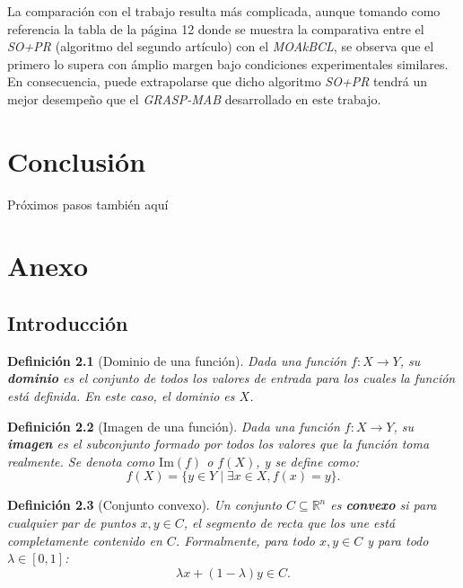 \documentclass[12pt,a4paper]{book}
\newtheorem{defi}{Definición}[section]
\begin{document}
La comparación con el trabajo \cite{k-Balanced_2} resulta más complicada, aunque tomando como referencia la tabla de la página 12 donde se muestra la comparativa entre el \textit{SO+PR} (algoritmo del segundo artículo) con el \textit{MOAkBCL}, se observa que el primero lo supera con ámplio margen bajo
condiciones experimentales similares. En consecuencia, puede extrapolarse que dicho algoritmo \textit{SO+PR} tendrá un mejor desempeño que el \textit{GRASP-MAB} desarrollado en este trabajo.

\chapter{Conclusión}

Próximos pasos también aquí








\chapter{Anexo}
\section{Introducción}
\begin{defi}[Dominio de una función]
\label{def:dominio}
Dada una función $f: X \to Y$, su \textbf{dominio} es el conjunto de todos los valores de entrada para los cuales la función está definida. En este caso, el dominio es $X$.
\end{defi}

\begin{defi}[Imagen de una función]
Dada una función $f: X \to Y$, su \textbf{imagen} es el subconjunto formado por todos los valores que la función toma realmente. Se denota como $\text{Im}(f)$ o $f(X)$, y se define como:
$$ f(X) = \{y \in Y \mid \exists x \in X, f(x) = y \} .$$
\end{defi}

\begin{defi}[Conjunto convexo]
\label{def:convexo}
Un conjunto $C \subseteq \mathbb{R}^n$ es \textbf{convexo} si para cualquier par de puntos $x, y \in C$, el segmento de recta que los une está completamente contenido en $C$. Formalmente, para todo $x, y \in C$ y para todo $\lambda \in [0, 1]$:
$$ \lambda x + (1-\lambda)y \in C .$$
\end{defi}
\end{document}

